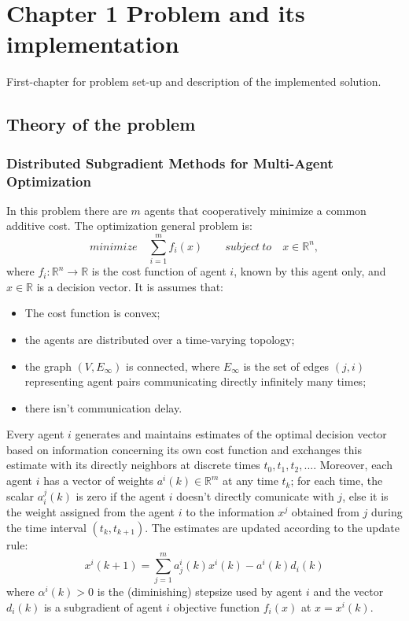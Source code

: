 \documentclass[a4paper,11pt,oneside]{book}
\begin{document}
\chapter{Chapter 1 Problem and its implementation} \label{Cap1}
First-chapter for problem set-up and description of the implemented solution. 

\section{Theory of the problem} \label{Sec1.1}
\subsection {Distributed Subgradient Methods for Multi-Agent Optimization} \label{Subsec1.1.1}
In this problem there are $m$ agents that cooperatively minimize a common additive cost. The optimization general problem is:\\
\begin{equation} \label{costfunct}
minimize \quad \sum\limits_{i=1}^{m} f_{i} \left( x \right) \qquad subject \ to \quad x \in \mathbb{R}^n,
\end{equation}
where $f_i : \mathbb{R}^n \longrightarrow \mathbb{R}$ is the cost function of agent $i$, known by this agent only, and $x \in \mathbb{R}$ is a decision vector. It is assumes that:
\begin{itemize} 
\item The cost function is convex;
\item the agents are distributed over a time-varying topology;
\item the graph $\left(V,E_\infty\right)$ is connected, where $E_\infty$ is the set of edges $\left(j,i\right)$ representing agent pairs communicating directly infinitely many times;
\item there isn't communication delay.
\end{itemize} 
Every agent $i$ generates and maintains estimates of the optimal decision vector based on information concerning its own cost function and exchanges this estimate with its directly neighbors at discrete times $t_0, t_1, t_2, ...$. Moreover, each agent $i$ has a vector of weights $a^i(k) \in \mathbb{R}^m$ at any time $t_k$; for each time, the scalar $a_i^j(k)$ is zero if the agent $i$ doesn't directly comunicate with $j$, else it is the weight assigned from the agent $i$ to the information $x^j$ obtained from $j$ during the time interval $(t_k,t_{k+1})$. The estimates are updated according to the update rule:
\begin{equation} \label{update}
x^i\left(k+1\right) = \sum_{j=1}^{m}{a_j^i\left(k\right)x^i\left(k\right)-a^i\left(k\right)d_i\left(k\right)}
\end{equation}
where $\alpha^i(k)>0$ is the (diminishing) stepsize used by agent $i$ and the vector $d_i(k)$ is a subgradient of agent $i$ objective function $f_i(x)$ at $x=x^i(k)$. \cite{CITATION:1}
\end{document}
